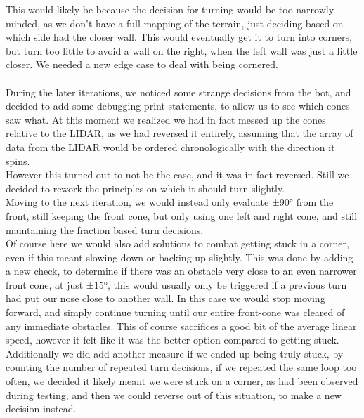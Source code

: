 \documentclass[conference]{IEEEtran}
\begin{document}
This would likely be because the decision for turning would be too narrowly minded, as we don't have a 
full mapping of the terrain, just deciding based on which side had the closer wall. 
This would eventually get it to turn into corners, but turn too little to avoid a wall on the right, 
when the left wall was just a little closer. We needed a new edge case to deal with being cornered.
\\\\
During the later iterations, we noticed some strange decisions from the bot, and decided to add some debugging print
statements, to allow us to see which cones saw what. At this moment we realized we had in fact messed up the cones 
relative to the LIDAR, as we had reversed it entirely, assuming that the array of data from the LIDAR would be ordered 
chronologically with the direction it spins. \\
However this turned out to not be the case, and it was in fact reversed. 
Still we decided to rework the principles on which it should turn slightly. \\
Moving to the next iteration, we would instead only evaluate ±90° from the front, 
still keeping the front cone, but only using one left and right cone, 
and still maintaining the fraction based turn decisions. \\
Of course here we would also add solutions to combat getting stuck in a corner, even if this meant slowing down or backing up slightly. 
This was done by adding a new check, to determine if there was an obstacle very close to an even narrower front cone, at just ±15°, 
this would usually only be triggered if a previous turn had put our nose close to another wall. 
In this case we would stop moving forward, and simply continue turning until our entire front-cone 
was cleared of any immediate obstacles. This of course sacrifices a good bit 
of the average linear speed, however it felt like it was the better option compared to getting stuck. 
Additionally we did add another measure if we ended up being truly stuck, by counting the number of repeated turn decisions, 
if we repeated the same loop too often, we decided it likely meant we were stuck on a corner, as had been observed during testing, 
and then we could reverse out of this situation, to make a new decision instead.
\\\\
\end{document}
